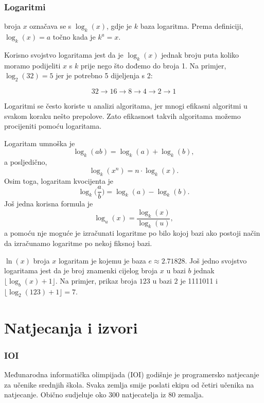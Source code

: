 \subsubsection{Logaritmi}


 broja $x$
označava se s $\log_k(x)$, gdje je $k$ baza
logaritma.
Prema definiciji,
$\log_k(x)=a$ točno kada je $k^a=x$.

Korisno svojstvo logaritama jest
da je $\log_k(x)$ jednak broju puta
koliko moramo podijeliti $x$ s $k$ prije nego što dođemo 
do broja 1.
Na primjer, $\log_2(32)=5$
jer je potrebno 5 dijeljenja s 2:

\[32 \rightarrow 16 \rightarrow 8 \rightarrow 4 \rightarrow 2 \rightarrow 1 \]

Logaritmi se često koriste u analizi
algoritama, jer mnogi efikasni algoritmi
u svakom koraku nešto prepolove.
Zato efikasnost takvih algoritama možemo
procijeniti pomoću logaritama.

Logaritam umnoška je
\[\log_k(ab) = \log_k(a)+\log_k(b),\]
a posljedično,
\[\log_k(x^n) = n \cdot \log_k(x).\]
Osim toga, logaritam kvocijenta je
\[\log_k\Big(\frac{a}{b}\Big) = \log_k(a)-\log_k(b).\]
Još jedna korisna formula je
\[\log_u(x) = \frac{\log_k(x)}{\log_k(u)},\]
a pomoću nje moguće je izračunati
logaritme po bilo kojoj bazi ako postoji način da
izračunamo logaritme po nekoj fiksnoj bazi.


 $\ln(x)$ broja $x$
logaritam je kojemu je baza $e \approx 2.71828$.
Još jedno svojstvo logaritama jest da je
broj znamenki cijelog broja $x$ u bazi $b$ jednak
$\lfloor \log_b(x)+1 \rfloor$.
Na primjer, prikaz broja
$123$ u bazi $2$ je 1111011 i
$\lfloor \log_2(123)+1 \rfloor = 7$.

\section{Natjecanja i izvori}

\subsubsection{IOI}

Međunarodna informatička olimpijada (IOI)
godišnje je programersko natjecanje za
učenike srednjih škola.
Svaka zemlja smije poslati ekipu od
četiri učenika na natjecanje.
Obično sudjeluje oko 300 natjecatelja
iz 80 zemalja.

